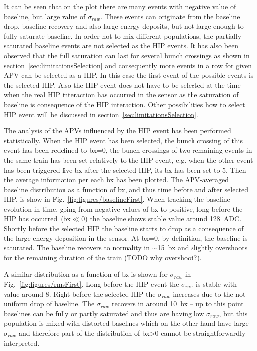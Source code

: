 It can be seen that on the plot there are many events with negative value of baseline, but large value of $\sigma_{raw}$. These events can originate from the baseline drop, baseline recovery and also large energy deposits, but not large enough to fully saturate baseline. In order not to mix different populations, the partially saturated baseline events are not selected as the HIP events. It has also been observed that the full saturation can last for several bunch crossings as shown in section~\ref{sec:limitationsSelection} and consequently more events in a row for given APV can be selected as a HIP. In this case the first event of the possible events is the selected HIP. Also the HIP event does not have to be selected at the time when the real HIP interaction has occurred in the sensor as the saturation of baseline is consequence of the HIP interaction. Other possibilities how to select HIP event will be discussed in section~\ref{sec:limitationsSelection}.

The analysis of the APVs influenced by the HIP event has been performed statistically. When the HIP event has been selected, the bunch crossing of this event has been redefined to bx=0, the bunch crossings of two remaining events in the same train has been set relatively to the HIP event, e.g. when the other event has been triggered five bx after the selected HIP, its bx has been set to 5. Then the average information per each bx has been plotted. The APV-averaged baseline distribution as a function of bx, and thus time before and after selected HIP, is show in Fig.~\ref{fig:figures/baselineFirst}. When tracking the baseline evolution in time, going from negative values of bx to positive, long before the HIP has occurred~(bx$\ll$0) the baseline shows stable value around 128~ADC. Shortly before the selected HIP the baseline starts to drop as a consequence of the large energy deposition in the sensor. At bx=0, by definition, the baseline is saturated. The baseline recovers to normality in $\sim$15~bx and slightly overshoots for the remaining duration of the train (TODO why overshoot?).

A similar distribution as a function of bx is shown for $\sigma_{raw}$ in Fig.~\ref{fig:figures/rmsFirst}. Long before the HIP event the $\sigma_{raw}$ is stable with value around 8. Right before the selected HIP the $\sigma_{raw}$ increases due to the not uniform drop of baseline. The $\sigma_{raw}$ recovers in around 10~bx --  up to this point baselines can be fully or partly saturated and thus are having low $\sigma_{raw}$, but this population is mixed with distorted baselines which on the other hand have large $\sigma_{raw}$ and therefore part of the distribution of bx>0 cannot be straightforwardly interpreted.


